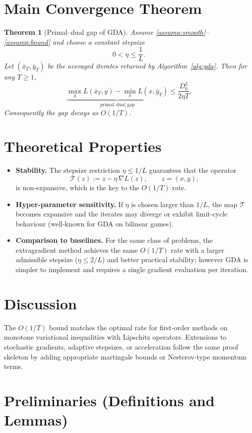 \documentclass{article}
\newtheorem{theorem}{Theorem}
\begin{document}
\section*{Main Convergence Theorem}
\begin{theorem}[Primal–dual gap of GDA]\label{thm:gap}
Assume \ref{assump:smooth}–\ref{assump:bound} and choose a constant stepsize 
\[
0<\eta\le\frac{1}{L}.
\]
Let $(\bar{x}_T,\bar{y}_T)$ be the averaged iterates returned by Algorithm~\ref{alg:gda}. Then for any $T\ge 1$,
\[
\underbrace{\max_{y}L(\bar{x}_T,y)-\min_{x}L(x,\bar{y}_T)}_{\displaystyle\text{primal–dual gap}}
\le \frac{D_0^2}{2\eta T}.
\]
Consequently the gap decays as $O(1/T)$.
\end{theorem}

\section*{Theoretical Properties}
\begin{itemize}
\item \textbf{Stability.} The stepsize restriction $\eta\le 1/L$ guarantees that the operator
\[
\mathcal{T}(z):=z-\eta \,\nabla L(z),\qquad z=(x,y),
\]
is non‑expansive, which is the key to the $O(1/T)$ rate.
\item \textbf{Hyper‑parameter sensitivity.} If $\eta$ is chosen larger than $1/L$, the map $\mathcal{T}$ becomes expansive and the iterates may diverge or exhibit limit‑cycle behaviour (well‑known for GDA on bilinear games).
\item \textbf{Comparison to baselines.} For the same class of problems, the extragradient method achieves the same $O(1/T)$ rate with a larger admissible stepsize ($\eta\le 2/L$) and better practical stability; however GDA is simpler to implement and requires a single gradient evaluation per iteration.
\end{itemize}

\section*{Discussion}
The $O(1/T)$ bound matches the optimal rate for first‑order methods on monotone variational inequalities with Lipschitz operators. Extensions to stochastic gradients, adaptive stepsizes, or acceleration follow the same proof skeleton by adding appropriate martingale bounds or Nesterov‑type momentum terms.

\newpage
\section*{Preliminaries (Definitions and Lemmas)}
\end{document}

